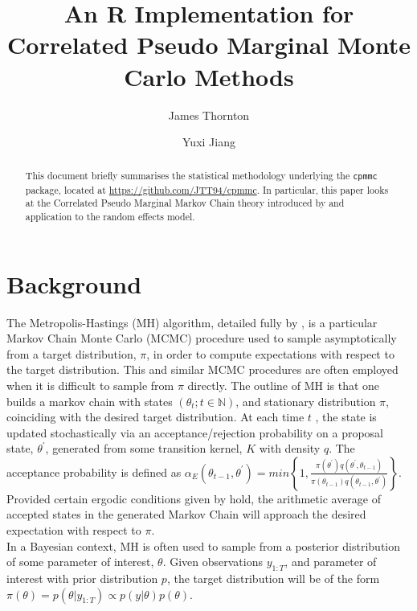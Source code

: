 \documentclass{article}
\title{An R Implementation for Correlated Pseudo Marginal Monte Carlo Methods}
\author{James Thornton \and Yuxi Jiang}
\begin{document}



\maketitle

\begin{abstract}
This document briefly summarises the statistical methodology underlying the \texttt{cpmmc} package, located at \url{https://github.com/JTT94/cpmmc}. In particular, this paper looks at the Correlated Pseudo Marginal Markov Chain theory introduced by \cite{cpmmDeligiannidis2015} and application to the random effects model.
\end{abstract}

\section{Background}

The Metropolis-Hastings (MH) algorithm, detailed fully by \cite{roberts2004}, is a particular Markov Chain Monte Carlo (MCMC) procedure used to sample asymptotically from a target distribution, $\pi$, in order to compute expectations with respect to the target distribution. This and similar MCMC procedures are often employed when it is difficult to sample from $\pi$ directly. The outline of MH is that one builds a markov chain with states $( \theta_t ; t \in \mathbb{N})$, and stationary distribution $\pi$, coinciding with the desired target distribution. At each time $ t $ , the state is updated stochastically via an acceptance/rejection probability on a proposal state, $\theta^\prime$, generated from some transition kernel, $K$ with density $q$. The acceptance probability is defined as  $ \alpha_E(\theta_{t-1}, \theta^\prime) = min\left\{1,  \frac{
                \pi(\theta^\prime) q(\theta^\prime, \theta_{t-1})}
                {\pi(\theta_{t-1}) q(\theta_{t-1}, \theta^\prime)}
\right\} $. Provided certain ergodic conditions given by \cite{roberts2004} hold, the arithmetic average of accepted states in the generated Markov Chain will approach the desired expectation with respect to $\pi$. \\

In a Bayesian context, MH is often used to sample from a posterior distribution of some parameter of interest, $\theta$. Given observations $y_{1:T}$, and parameter of interest with prior distribution $p$, the target distribution will be of the form $\pi (\theta) = p(\theta | y_{1:T} ) \propto p(y|\theta) p(\theta)$.\\
\end{document}
